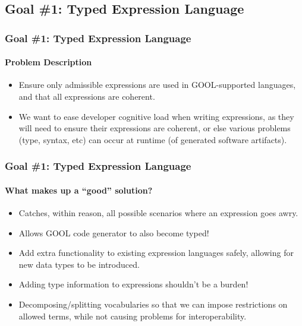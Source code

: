 \documentclass{beamer}
\begin{document}
\subsection{Goal \#1: Typed Expression Language}

\begin{frame}
    \frametitle{Goal \#1: Typed Expression Language}
    \framesubtitle{Problem Description}
    
    \begin{itemize}
        \item<2-> Ensure only admissible expressions are used in GOOL-supported languages, and that all expressions are coherent.
        \item<3-> We want to ease developer cognitive load when writing expressions, as they will need to ensure their expressions are coherent, or else various problems (type, syntax, etc) can occur at runtime (of generated software artifacts).
    \end{itemize}
\end{frame}

\begin{frame}
    \frametitle{Goal \#1: Typed Expression Language}
    \framesubtitle{What makes up a ``good'' solution?}
    
    \begin{itemize}
        \item<2-> Catches, within reason, all possible scenarios where an expression goes awry.
        \item<3-> Allows GOOL code generator to also become typed!
        \item<4-> Add extra functionality to existing expression languages safely, allowing for new data types to be introduced.
        \item<5-> Adding type information to expressions shouldn't be a burden!
        \item<6-> Decomposing/splitting vocabularies so that we can impose restrictions on allowed terms, while not causing problems for interoperability.
    \end{itemize}
\end{frame}
\end{document}
